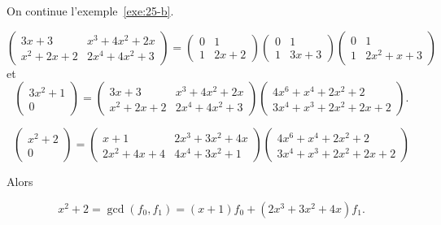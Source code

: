 \begin{example}
  \label{exe:26}
  On continue l'exemple~\ref{exe:25-b}.


  \begin{displaymath}
    \left(\begin{array}{rr}
3 x + 3 & x^{3} + 4 x^{2} + 2 x \\
x^{2} + 2 x + 2 & 2 x^{4} + 4 x^{2} + 3
\end{array}\right) = 
    \left(\begin{array}{rr}
0 & 1 \\
1 & 2 x + 2
\end{array}\right) \left(\begin{array}{rr}
0 & 1 \\
1 & 3 x + 3
\end{array}\right) \left(\begin{array}{rr}
0 & 1 \\
1 & 2 x^{2} + x + 3
                         \end{array}\right)                                 
                     \end{displaymath}
                     et
\begin{displaymath}
\left(\begin{array}{r}
3 x^{2} + 1 \\
0
\end{array}\right) = \left(\begin{array}{rr}
3 x + 3 & x^{3} + 4 x^{2} + 2 x \\
x^{2} + 2 x + 2 & 2 x^{4} + 4 x^{2} + 3
\end{array}\right)
\left(\begin{array}{r}
4 x^{6} + x^{4} + 2 x^{2} + 2 \\
3 x^{4} + x^{3} + 2 x^{2} + 2 x + 2
\end{array}\right).   
\end{displaymath}

\begin{displaymath}
 \left(\begin{array}{r}
x^{2} + 2 \\
0
\end{array}\right) =
\left(\begin{array}{rr}
x + 1 & 2 x^{3} + 3 x^{2} + 4 x \\
2 x^{2} + 4 x + 4 & 4 x^{4} + 3 x^{2} + 1
\end{array}\right)
\left(\begin{array}{r}
4 x^{6} + x^{4} + 2 x^{2} + 2 \\
3 x^{4} + x^{3} + 2 x^{2} + 2 x + 2
\end{array}\right)
\end{displaymath}

Alors

\begin{displaymath}
  x^{2} + 2 = \gcd(f_0,f_1) = (x + 1)f_0 + (2 x^{3} + 3 x^{2} + 4 x) f_1. 
\end{displaymath}
\end{example}



